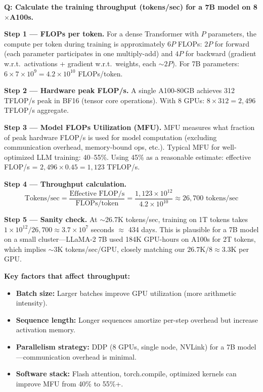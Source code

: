 \begin{interviewq}
\textbf{Q: Calculate the training throughput (tokens/sec) for a 7B model on 8$\times$A100s.}

 \quad {} \quad \badgefreq{\freqlow}

\stronganswer

\textbf{Step 1 --- FLOPs per token.} For a dense Transformer with $P$ parameters, the compute per token during training is approximately $6P$ FLOPs: $2P$ for forward (each parameter participates in one multiply-add) and $4P$ for backward (gradient w.r.t.\ activations + gradient w.r.t.\ weights, each $\sim 2P$). For 7B parameters: $6 \times 7 \times 10^9 = 4.2 \times 10^{10}$ FLOPs/token.

\textbf{Step 2 --- Hardware peak FLOP/s.} A single A100-80GB achieves 312 TFLOP/s peak in BF16 (tensor core operations). With 8 GPUs: $8 \times 312 = 2{,}496$ TFLOP/s aggregate.

\textbf{Step 3 --- Model FLOPs Utilization (MFU).} MFU measures what fraction of peak hardware FLOP/s is used for model computation (excluding communication overhead, memory-bound ops, etc.). Typical MFU for well-optimized LLM training: 40--55\%. Using 45\% as a reasonable estimate: effective FLOP/s = $2{,}496 \times 0.45 = 1{,}123$ TFLOP/s.

\textbf{Step 4 --- Throughput calculation.}
\begin{equation}
\text{Tokens/sec} = \frac{\text{Effective FLOP/s}}{\text{FLOPs/token}} = \frac{1{,}123 \times 10^{12}}{4.2 \times 10^{10}} \approx 26{,}700 \text{ tokens/sec}
\end{equation}

\textbf{Step 5 --- Sanity check.} At $\sim$26.7K tokens/sec, training on 1T tokens takes $1 \times 10^{12} / 26{,}700 \approx 3.7 \times 10^7$ seconds $\approx$ 434 days. This is plausible for a 7B model on a small cluster---LLaMA-2 7B used 184K GPU-hours on A100s for 2T tokens, which implies $\sim$3K tokens/sec/GPU, closely matching our $26.7\text{K}/8 \approx 3.3\text{K}$ per GPU.

\textbf{Key factors that affect throughput:}
\begin{itemize}
    \item \textbf{Batch size:} Larger batches improve GPU utilization (more arithmetic intensity).
    \item \textbf{Sequence length:} Longer sequences amortize per-step overhead but increase activation memory.
    \item \textbf{Parallelism strategy:} DDP (8 GPUs, single node, NVLink) for a 7B model---communication overhead is minimal.
    \item \textbf{Software stack:} Flash attention, torch.compile, optimized kernels can improve MFU from 40\% to 55\%+.
\end{itemize}


\end{interviewq}

